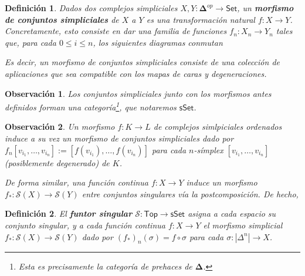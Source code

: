 \documentclass[11pt]{report}
\theoremstyle{colored}
\newtheorem{definition}{Definición}[section]
\newtheorem{remark}{Observación}[section]
\newcommand{\cat}[1]{\mathsf{#1}}
\renewcommand{\ss}[1]{\Delta^{#1}}
\newcommand{\ordcat}{\boldsymbol{\Delta}}
\begin{document}
\begin{definition} Dados dos complejos simpliciales $X,Y : \ordcat^{op} \to \cat{Set}$, un \textbf{morfismo de conjuntos simpliciales} de $X$ a $Y$ es una transformación natural $f : X \to Y$. Concretamente, esto consiste en dar una familia de funciones $f_n : X_n \to Y_n$ tales que, para cada $0 \leq i \leq n$, los siguientes diagramas conmutan
\begin{center}
\end{center}

Es decir, un morfismo de conjuntos simpliciales consiste de una colección de aplicaciones que sea compatible con los mapas de caras y degeneraciones.
\end{definition}

\begin{remark} Los conjuntos simpliciales junto con los morfismos antes definidos forman una categoría\footnote{Esta es precisamente la categoría de prehaces de $\ordcat$.}, que notaremos $\cat{sSet}$.
\end{remark}

\begin{remark} Un morfismo $f : K \to L$ de complejos simlpiciales ordenados induce a su vez un morfismo de conjuntos simpliciales dado por $f_n[v_{i_1}, \dots, v_{i_n}] := [f(v_{i_1}), \dots, f(v_{i_n})]$ para cada $n$-símplex $[v_{i_1}, \dots, v_{i_n}]$ (posiblemente degenerado) de $K$.

De forma similar, una función continua $f : X \to Y$ induce un morfismo $f_* : \mathcal{S}(X) \to \mathcal{S}(Y)$ entre conjuntos singulares vía la postcomposición. De hecho, 
\end{remark}

\begin{definition} El \textbf{funtor singular} $\mathcal{S} : \cat{Top} \to \cat{sSet}$ asigna a cada espacio su conjunto singular, y a cada función continua $f : X \to Y$ el morfismo simplicial $f_* : \mathcal{S}(X) \to \mathcal{S}(Y)$ dado por $(f_*)_n(\sigma) =  f \circ \sigma$ para cada $\sigma: |\ss{n}| \to X$.
\end{definition}
\end{document}
